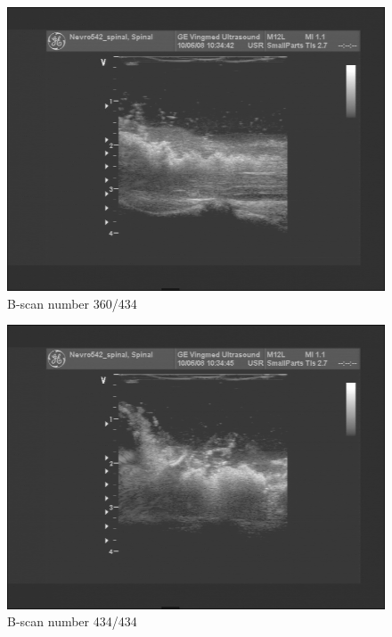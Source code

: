 \begin{figure}[h]
\centering
\includegraphics[height=0.45\textheight]{graphics/360.png}
\caption{B-scan number 360/434}
\label{fig:360}
\end{figure}

\begin{figure}[h]
\centering
\includegraphics[height=0.45\textheight]{graphics/434.png}
\caption{B-scan number 434/434}
\label{fig:434}
\end{figure}


